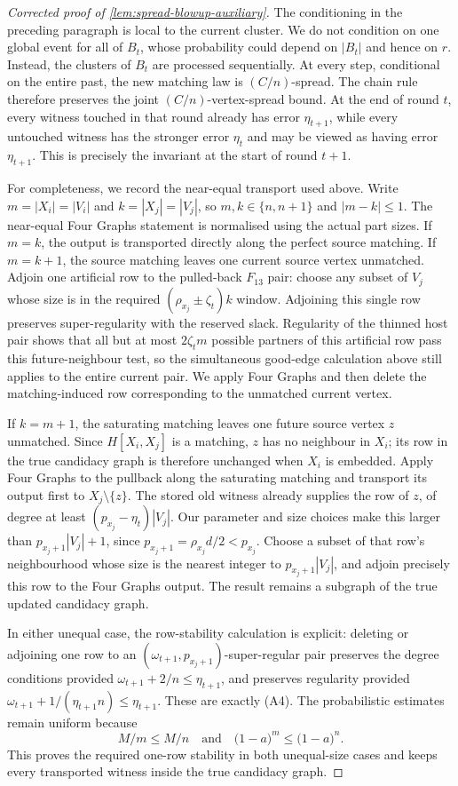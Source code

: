 \begin{proof}[Corrected proof of \cref{lem:spread-blowup-auxiliary}]
The conditioning in the preceding paragraph is local to the current cluster.
We do not condition on one global event for all of $B_t$, whose probability
could depend on $|B_t|$ and hence on $r$.  Instead, the clusters of $B_t$ are
processed sequentially.  At every step, conditional on the entire past, the
new matching law is $(C/n)$-spread.  The chain rule therefore preserves the
joint $(C/n)$-vertex-spread bound.  At the end of round $t$, every witness
touched in that round already has error $\eta_{t+1}$, while every untouched
witness has the stronger error $\eta_t$ and may be viewed as having error
$\eta_{t+1}$.  This is precisely the invariant at the start of round $t+1$.

For completeness, we record the near-equal transport used above.  Write
$m=|X_i|=|V_i|$ and $k=|X_j|=|V_j|$, so
$m,k\in\{n,n+1\}$ and $|m-k|\leq1$.  The near-equal Four Graphs statement is
normalised using the actual part sizes.  If $m=k$, the output is transported
directly along the perfect source matching.  If $m=k+1$, the source matching
leaves one current source vertex unmatched.  Adjoin one artificial row to the
pulled-back $F_{13}$ pair: choose any subset of $V_j$ whose size is in the
required $(\rho_{x_j}\pm\zeta_t)k$ window.  Adjoining this single row
preserves super-regularity with the reserved slack.  Regularity of the
thinned host pair shows that all but at most $2\zeta_t m$ possible partners
of this artificial row pass this future-neighbour test, so the simultaneous
good-edge calculation above still applies to the entire current pair.  We
apply Four Graphs and then delete the matching-induced row corresponding to
the unmatched current vertex.

If $k=m+1$, the saturating matching leaves one future source vertex $z$
unmatched.  Since $H[X_i,X_j]$ is a matching, $z$ has no neighbour in $X_i$;
its row in the true candidacy graph is therefore unchanged when $X_i$ is
embedded.  Apply Four Graphs to the pullback along the saturating matching
and transport its output first to $X_j\setminus\{z\}$.  The stored old
witness already supplies the row of $z$, of degree at least
$(p_{x_j}-\eta_t)|V_j|$.  Our parameter and size choices make this larger
than $p_{x_j+1}|V_j|+1$, since
$p_{x_j+1}=\rho_{x_j}d/2<p_{x_j}$.  Choose a subset of that row's
neighbourhood whose size is the nearest integer to
$p_{x_j+1}|V_j|$, and adjoin precisely this row to the Four Graphs output.
The result remains a subgraph of the true updated candidacy graph.

In either unequal case, the row-stability calculation is explicit: deleting
or adjoining one row to an $(\omega_{t+1},p_{x_j+1})$-super-regular pair
preserves the degree conditions provided
$\omega_{t+1}+2/n\leq\eta_{t+1}$, and preserves regularity provided
$\omega_{t+1}+1/(\eta_{t+1}n)\leq\eta_{t+1}$.  These are exactly (A4).
The probabilistic estimates remain uniform because
\[
    M/m\leq M/n
    \quad\text{and}\quad
    \bigl(1-a\bigr)^{m}\leq\bigl(1-a\bigr)^{n}.
\]
This proves the required one-row stability in both unequal-size cases and
keeps every transported witness inside the true candidacy graph.


\end{proof}
